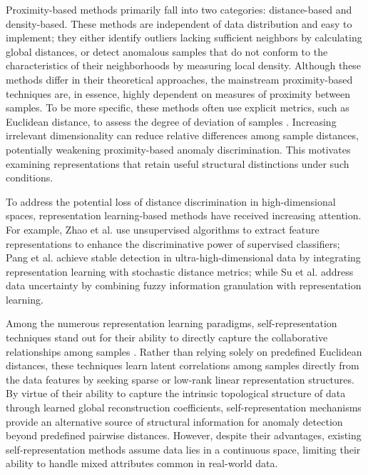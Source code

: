 \documentclass[ASNA,twocolumn]{USG} %
\begin{document}
Proximity-based methods primarily fall into two categories: distance-based and density-based. These methods are independent of data distribution and easy to implement; they either identify outliers lacking sufficient neighbors by calculating global distances, or detect anomalous samples that do not conform to the characteristics of their neighborhoods by measuring local density. Although these methods differ in their theoretical approaches, the mainstream proximity-based techniques are, in essence, highly dependent on measures of proximity between samples.
To be more specific, these methods often use explicit metrics, such as Euclidean distance, to assess the degree of deviation of samples \cite {mandhare2017comparative}. Increasing irrelevant dimensionality can reduce relative differences among sample distances, potentially weakening proximity-based anomaly discrimination. This motivates examining representations that retain useful structural distinctions under such conditions.


To address the potential loss of distance discrimination in high-dimensional spaces, representation learning-based methods have received increasing attention. For example, Zhao et al. \cite{zhao2018xgbod} use unsupervised algorithms to extract feature representations to enhance the discriminative power of supervised classifiers; Pang et al. \cite{pang2018learning} achieve stable detection in ultra-high-dimensional data by integrating representation learning with stochastic distance metrics; while Su et al. \cite{su2026outlier} address data uncertainty by combining fuzzy information granulation with representation learning. 

Among the numerous representation learning paradigms, self-representation techniques stand out for their ability to directly capture the collaborative relationships among samples \cite{quan2025class}. Rather than relying solely on predefined Euclidean distances, these techniques learn latent correlations among samples directly from the data features by seeking sparse or low-rank linear representation structures. By virtue of their ability to capture the intrinsic topological structure of data through learned global reconstruction coefficients, self-representation mechanisms provide an alternative source of structural information for anomaly detection beyond predefined pairwise distances.
However, despite their advantages, existing self-representation methods assume data lies in a continuous space, limiting their ability to handle mixed attributes common in real-world data.
\end{document}
